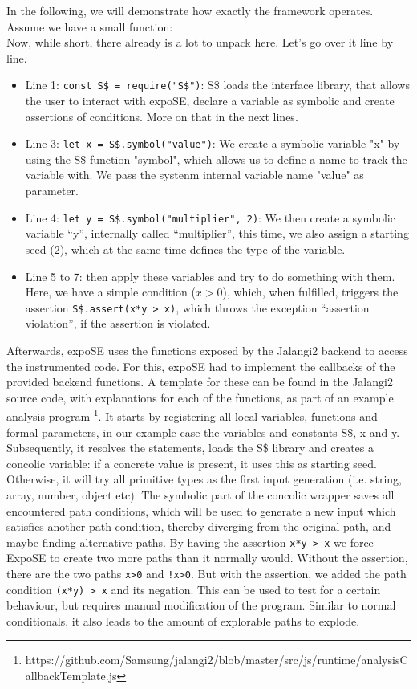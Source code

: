 In the following, we will demonstrate how exactly the framework operates. \\
Assume we have a small function:\\
Now, while short, there already is a lot to unpack here. Let's go over it line by line. 
\begin{itemize}
    \item Line 1: \lstinline{const S$ = require("S$")}: S\$ loads the interface library, that allows the user to interact with expoSE, declare a variable as symbolic and create assertions of conditions. More on that in the next lines.
    \item Line 3: \lstinline{let x = S$.symbol("value")}: We create a symbolic variable "x" by using the S\$ function "symbol", which allows us to define a name to track the variable with. We pass the systenm internal variable name "value" as parameter.  
    \item Line 4: \lstinline{let y = S$.symbol("multiplier", 2)}: We then create a symbolic variable “y”, internally called “multiplier”, this time, we also assign a starting seed (2), which at the same time defines the type of the variable.
    \item Line 5 to 7: then apply these variables and try to do something with them. Here, we have a simple condition ($x > 0$), which, when fulfilled, triggers the assertion \lstinline{S$.assert(x*y > x)}, which throws the exception “assertion violation”, if  the assertion is violated.
\end{itemize}
Afterwards, expoSE uses the functions exposed by the Jalangi2 backend  to access the instrumented code. For this, expoSE had to implement the callbacks of the provided backend functions. A template for these can be found in the Jalangi2 source code, with explanations for each of the functions, as part of an example analysis program \footnote{https://github.com/Samsung/jalangi2/blob/master/src/js/runtime/analysisCallbackTemplate.js}. 
It starts by registering all local variables, functions and formal parameters, in our example case the variables and constants S\$, x and y. Subsequently, it resolves the statements, loads the S\$ library and creates a concolic variable: if a concrete value is present, it uses this as starting seed. Otherwise, it will try all primitive types as the first input generation (i.e. string, array, number, object etc). The symbolic part of the concolic wrapper saves all encountered path conditions, which will be used to generate a new input which satisfies another path condition, thereby diverging from the original path, and maybe finding alternative paths.
By having the assertion \lstinline{x*y > x} we force ExpoSE to create two more paths than it normally would. Without the assertion, there are the two paths \lstinline{x>0} and \lstinline{!x>0}. But with the assertion, we added the path condition \lstinline{(x*y) > x} and its negation. This can be used to test for a certain behaviour, but requires manual modification of the program. Similar to normal conditionals, it also leads to the amount of explorable paths to explode.